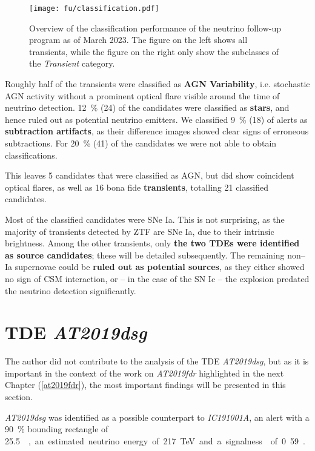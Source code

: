 \begin{figure*}[t]
    \texttt{[image: fu/classification.pdf]}
    \caption[Follow-up classification overview]{Overview of the classification performance of the neutrino follow-up program as of March 2023. The figure on the left shows all transients, while the figure on the right only show the subclasses of the \textit{Transient} category.}
\end{figure*}

Roughly half of the transients were classified as \textbf{AGN Variability}, i.e. stochastic AGN activity without a prominent optical flare visible around the time of neutrino detection. \SI{12}{\percent} (24) of the candidates were classified as \textbf{stars}, and hence ruled out as potential neutrino emitters. We classified \SI{9}{\percent} (18) of alerts as \textbf{subtraction artifacts}, as their difference images showed clear signs of erroneous subtractions. For \SI{20}{\percent} (41) of the candidates we were not able to obtain classifications. 

This leaves 5 candidates that were classified as AGN, but did show coincident optical flares, as well as 16 bona fide \textbf{transients}, totalling 21 classified candidates.

Most of the classified candidates were SNe Ia. This is not surprising, as the majority of transients detected by ZTF are SNe Ia, due to their intrinsic brightness. Among the other transients, only \textbf{the two TDEs were identified as source candidates}; these will be detailed subsequently. The remaining non--Ia supernovae could be \textbf{ruled out as potential sources}, as they either showed no sign of CSM interaction, or -- in the case of the SN Ic -- the explosion predated the neutrino detection significantly.

\section{TDE \emph{AT2019dsg}}
The author did not contribute to the analysis of the TDE \emph{AT2019dsg}, but as it is important in the context of the work on \emph{AT2019fdr} highlighted in the next Chapter (\ref{at2019fdr}), the most important findings will be presented in this section.

\emph{AT2019dsg} was identified as a possible counterpart to \emph{IC191001A}, an alert with a \SI{90}{\percent} bounding rectangle of \SI{25.5}{\square\deg}, an estimated neutrino energy of \SI{217}{\tera\eV} and a signalness of 0.59 .

